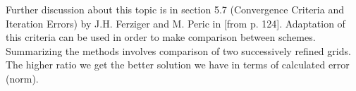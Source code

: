 	Further discussion about this topic is in section 5.7 (Convergence Criteria and Iteration Errors) by J.H. Ferziger and M. Peric in \cite{bib:ferzinger}[from p. 124]. Adaptation of this criteria can be used in order to make comparison between schemes. Summarizing the methods involves comparison of two successively refined grids. The higher ratio we get the better solution we have in terms of calculated error (norm).